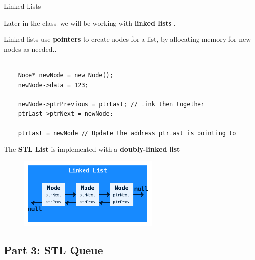 \documentclass[a4paper,12pt]{book}
\begin{document}
                
            \begin{intro}{ Linked Lists }

            Later in the class, we will be working with \textbf{ linked lists }.

            Linked lists use \textbf{ pointers } to create nodes for a list,
            by allocating memory for new nodes as needed...

    \footnotesize 
\begin{verbatim}

    Node* newNode = new Node();
    newNode->data = 123;
    
    newNode->ptrPrevious = ptrLast; // Link them together
    ptrLast->ptrNext = newNode;

    ptrLast = newNode // Update the address ptrLast is pointing to
\end{verbatim}

            The \textbf{ STL List } is implemented with a \textbf{ doubly-linked list }

            
            \end{intro}

                \begin{figure}[h]
                    \centering
                    \includegraphics[height=3.5cm]{lab01-basic-linked-list}
                \end{figure}









                    

            \newpage
            \subsection*{Part 3: STL Queue}
\end{document}
